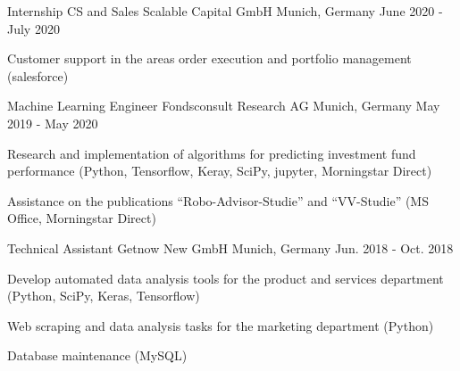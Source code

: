 \begin{cventries}

\cventry
{Internship CS and Sales} %
{Scalable Capital GmbH} %
{Munich, Germany} %
{June 2020 - July 2020} %
{ %
\begin{cvitems}
\item {Customer support in the areas order execution and portfolio management (salesforce)}
\end{cvitems}
}


\cventry
{Machine Learning Engineer} %
{Fondsconsult Research AG} %
{Munich, Germany} %
{May 2019 - May 2020} %
{ %
\begin{cvitems}
\item {Research and implementation of algorithms for predicting  investment fund performance (Python, Tensorflow, Keray, SciPy, jupyter, Morningstar Direct)}
\item {Assistance on the publications ``Robo-Advisor-Studie'' and ``VV-Studie'' (MS Office, Morningstar Direct)}
\end{cvitems}
}


\cventry
{Technical Assistant} %
{Getnow New GmbH} %
{Munich, Germany} %
{Jun. 2018 - Oct. 2018} %
{ %
\begin{cvitems}
\item {Develop automated data analysis tools for the product and services department (Python, SciPy, Keras, Tensorflow)}
\item {Web scraping and data analysis tasks for the marketing department (Python)}
\item {Database maintenance (MySQL)}
\end{cvitems}
}

\end{cventries}